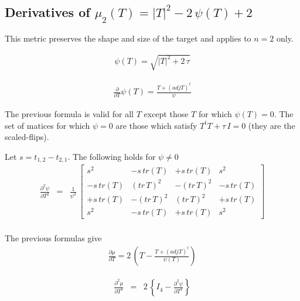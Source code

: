 \documentclass{report}
\begin{document}
\subsection{Derivatives of $\mu_2(T)=|T|^2 - 2 \, \psi(T) + 2$ \label{magic}}

This metric preserves the shape and size of the target and applies to $n=2$ only. \newline 

\begin{eqnarray}
\psi(T) = \sqrt{|T|^2 + 2 \, \tau} \label{psi-def}
\end{eqnarray}

\begin{eqnarray}
\frac{\partial}{\partial T} \psi(T) = \frac{T + (adj T)^t}{\psi} \label{psi-1st}
\end{eqnarray}

\noindent The previous formula is valid for all $T$ except those $T$ 
for which $\psi(T)=0$. The set of matices for which $\psi=0$ are those
which satisfy $T^t T + \tau \, I = 0$ (they are the scaled-flips). \newline

\noindent Let $s=t_{1,2}-t_{2,1}$. The following holds for $\psi \neq 0$
\begin{eqnarray}
\label{psi-2nd}
\frac{\partial^2 \psi}{\partial T^2}
 & = & \frac{1}{\psi^3} \, \left[ \begin{array}{cccc}
s^2 & -s \, tr(T) & +s \, tr(T) & s^2 \\
-s \, tr(T) & (tr \, T)^2 & -(tr \, T)^2 & -s \, tr(T) \\
+s \, tr(T) & -(tr \, T)^2 & (tr \, T)^2 & +s \, tr(T) \\
s^2 & -s \, tr(T) & +s \, tr(T) & s^2
\end{array} \right] \nonumber \\
\end{eqnarray}

\noindent The previous formulas give
\begin{eqnarray}
\label{psi1st}
\frac{\partial \mu}{\partial T} = 2 \, \left( T - \frac{T + (adj T)^t}{\psi(T)} \right)
\end{eqnarray}

\begin{eqnarray}
\label{psi2nd}
\frac{\partial^2 \mu}{\partial T^2}  & = & 2 \, \left\{ I_4 - \frac{\partial^2 \psi}{\partial T^2} \right\}
\end{eqnarray}
 
\end{document}
